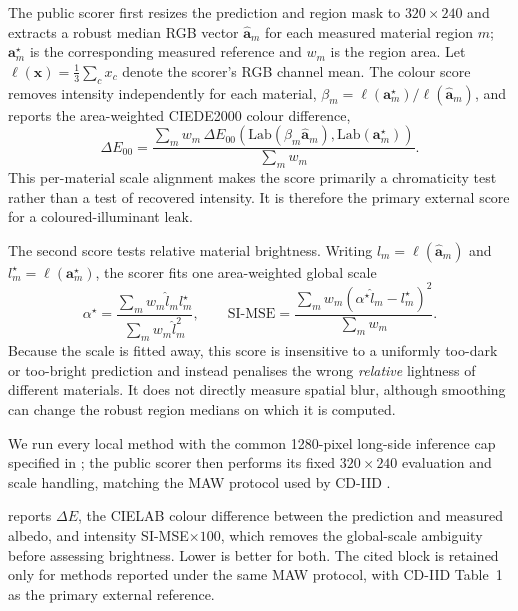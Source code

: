 The public scorer first resizes the prediction and region mask to $320\!\times\!240$
and extracts a robust median RGB vector $\hat{\mathbf a}_m$ for each measured material
region $m$; $\mathbf a_m^\star$ is the corresponding measured reference and $w_m$ is
the region area. Let $\ell(\mathbf x)=\tfrac{1}{3}\sum_c x_c$ denote the scorer's
RGB channel mean. The colour score removes intensity independently for each material,
$\beta_m=\ell(\mathbf a_m^\star)/\ell(\hat{\mathbf a}_m)$, and reports the area-weighted
CIEDE2000 colour difference,
\begin{equation}
  \Delta E_{00} =
  \frac{\sum_m w_m\,
  \Delta E_{00}\!\left(\mathrm{Lab}(\beta_m\hat{\mathbf a}_m),
  \mathrm{Lab}(\mathbf a_m^\star)\right)}{\sum_m w_m}.
  \label{eq:deltae}
\end{equation}
This per-material scale alignment makes the score primarily a chromaticity test rather
than a test of recovered intensity. It is therefore the primary external score for a
coloured-illuminant leak.

The second score tests relative material brightness. Writing
$\hat l_m=\ell(\hat{\mathbf a}_m)$ and $l_m^\star=\ell(\mathbf a_m^\star)$, the scorer fits
one area-weighted global scale
\begin{equation}
  \alpha^\star =
  \frac{\sum_m w_m\hat l_m l_m^\star}
       {\sum_m w_m\hat l_m^2},
  \qquad
  \text{SI-MSE} =
  \frac{\sum_m w_m(\alpha^\star\hat l_m-l_m^\star)^2}{\sum_m w_m}.
  \label{eq:simse}
\end{equation}
Because the scale is fitted away, this score is insensitive to a uniformly too-dark
or too-bright prediction and instead penalises the wrong \emph{relative} lightness of
different materials. It does not directly measure spatial blur, although smoothing can
change the robust region medians on which it is computed.

We run every local method with the common 1280-pixel long-side inference cap specified
in ; the public scorer then performs its fixed $320\!\times\!240$
evaluation and scale handling, matching the MAW protocol used by CD-IID
.

 reports $\Delta E$, the CIELAB colour difference between the
prediction and measured albedo, and intensity SI-MSE$\times100$, which removes
the global-scale ambiguity before assessing brightness. Lower is better for
both. The cited block is retained only for methods reported under the same MAW
protocol, with CD-IID Table~1 as the primary external reference.

